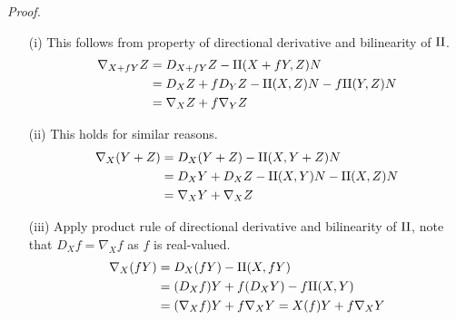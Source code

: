 \documentclass[12pt]{article}
\begin{document}
\emph{Proof.}
\begin{enumerate}
    \item[(i)] This follows from property of directional derivative and bilinearity of \(\mathrm{II}\).
        \begin{align*}
            \nabla_{X + f Y} Z &= D_{X+ fY} Z - \mathrm{II}(X + fY,Z) N \\
                               &= D_X Z + f D_Y Z - \mathrm{II}(X,Z)N - f\mathrm{II}(Y,Z)N \\
                               &= \nabla_X Z + f \nabla_Y Z
        \end{align*}
    \item[(ii)] This holds for similar reasons.
        \begin{align*}
            \nabla_X (Y + Z) &= D_X(Y + Z) - \mathrm{II}(X, Y + Z) N \\
                             &= D_X Y + D_X Z - \mathrm{II}(X,Y) N - \mathrm{II}(X,Z) N \\
                             &= \nabla_X Y + \nabla_X Z
        \end{align*}

    \item[(iii)] Apply product rule of directional derivative and bilinearity of \(\mathrm{II}\), note that \(D_X f = \nabla_X f\) as \(f\) is real-valued.
        \begin{align*}
            \nabla_X (fY) &= D_X(f Y) - \mathrm{II}(X,fY) \\
                          &= (D_X f) Y + f (D_X Y) - f \mathrm{II}(X,Y) \\
                          &= (\nabla_X f) Y + f\nabla_X Y = X (f) Y + f \nabla_X Y
        \end{align*}


\end{enumerate}
\end{document}
